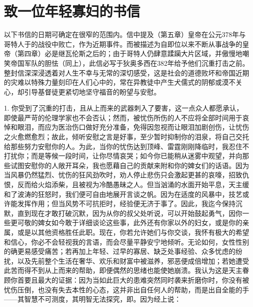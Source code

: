 
\chapter{致一位年轻寡妇的书信}


以下书信的日期可确定在很窄的范围内。信中提及（第五章）皇帝在公元378年与哥特人于的战役中败亡，作为近期事件。而被描述为自即位以来不断从事战争的皇帝（第四章）必是继瓦伦斯之后的；由于哥特人仍肆意蹂躏大片区域，并傲慢地嘲笑帝国军队的胆怯（同上），此信必写于狄奥多西在382年给予他们沉重打击之前。整封信深深浸透着对人生不幸与无常的深切感受，这是社会的道德败坏和帝国近期的灾难以特殊力量刻印在人们心中的，常在异教徒中产生犬儒式的阴郁或漠不关心，却引导基督徒更紧切地坚守福音的盼望与安慰。\par

1. 你受到了沉重的打击，且从上而来的武器刺入了要害，这一点众人都愿承认，即使最严苛的伦理学家也不会否认；然而，被忧伤所伤的人不应将全部时间用于哀悼和眼泪，而应为医治伤口做好充分准备，免得因忽视而让眼泪加剧创伤，让忧伤之火愈燃愈烈；故此，倾听安慰之言是好事，至少暂时抑制你的泪泉，将自己交托给那些努力安慰你的人。为此，当你的忧伤达到顶峰、雷霆刚刚降临时，我忍住不打扰你；而是等候一段时间，让你尽情哀哭；如今你已能稍从迷雾中观望，并向那些试图安慰你的人敞开耳朵，我也愿藉自己的贡献来附和你的婢女们的话语。因为当风暴仍然猛烈、忧伤的狂风劲吹时，劝人停止悲伤只会激起更甚的哀嚎，招致仇恨，反而给火焰添柴，且被视为冷酷愚昧之人。但当汹涌的水面开始平息，天主缓和了波涛的狂怒时，我们便可自由地展开言谈之帆。因为在适度的风暴中，技艺或许能发挥作用；但当风势不可抗拒时，经验便无济于事了。因此，我迄今保持沉默，直到现在才敢打破沉默，因为从你的叔父处听说，可以开始鼓起勇气，因你一些更可敬的婢女如今敢于详细谈论这些事，此外还有你家以外的妇女，或是你的亲属，或是以其他资格胜任此职。现在，你若允许她们与你交谈，我怀有极大的希望和信心，你必不会轻视我的言语，而会尽量平静安宁地倾听。无论如何，女性性别的确更易感受痛苦；若再加上年轻、过早的寡居、缺乏处事经验、众多忧虑的纷扰，以及先前整个生活在奢华、欢乐和财富中被滋养，邪恶便成倍增加；若她遭受此苦而得不到从上而来的帮助，即便偶然的思绪也能使她崩溃。我认为这是天主眷顾你首要且最大的证据：因为当如此巨大的患难突然同时袭来折磨你时，你没有被忧伤压倒，也没有失去本性的心态，这并非出自任何人的帮助，而是出自全能的手——其智慧不可测度，其明智无法探究，即。因为经上说：\par

